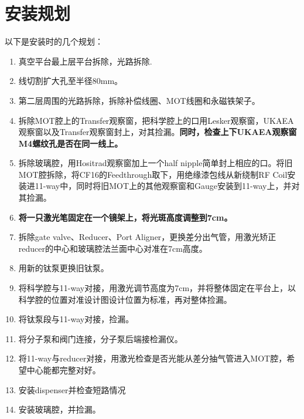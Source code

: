 \documentclass[onecolumn,a4paper,10pt]{article}
\begin{document}
\section{安装规划}

以下是安装时的几个规划：
\begin{enumerate}
\item 真空平台最上层平台拆除，光路拆除.\Checkmark
\item 线切割扩大孔至半径80mm。
\item 第二层周围的光路拆除，拆除补偿线圈、MOT线圈和永磁铁架子。
\item 拆除MOT腔上的Transfer观察窗，把科学腔上的口用Lesker观察窗，UKAEA观察窗以及Transfer观察窗封上，对其捡漏。\textbf{\color{blue}同时，检查上下UKAEA观察窗M4螺纹孔是否在同一线上。}
\item 拆除玻璃腔，用Hositrad观察窗加上一个half nipple简单封上相应的口。将旧MOT腔拆除，将CF16的Feedthrough取下，用绝缘漆包线从新绕制RF Coil安装进11-way中，同时将旧MOT上的其他观察窗和Gauge安装到11-way上，并对其捡漏。
\item \textbf{\color{red}将一只激光笔固定在一个镜架上，将光斑高度调整到7cm。}
\item 拆除gate valve、Reducer、Port Aligner，更换差分出气管，用激光矫正reducer的中心和玻璃腔法兰面中心对准在7cm高度。
\item 用新的钛泵更换旧钛泵。
\item 将科学腔与11-way对接，用激光调节高度为7cm，并将整体固定在平台上，以科学腔的位置对准设计图设计位置为标准，再对整体捡漏。
\item 将钛泵段与11-way对接，捡漏。
\item 将分子泵和阀门连接，分子泵后端接检漏仪。
\item 将11-way与reducer对接，用激光检查是否光能从差分抽气管进入MOT腔，希望中心能都完整对好。
\item 安装dispenser并检查短路情况
\item 安装玻璃腔，并捡漏。
\end{enumerate}
\end{document}
